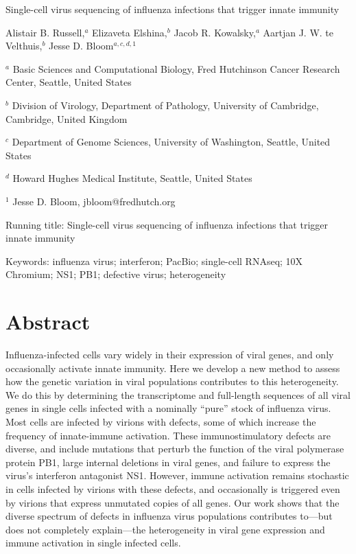 \documentclass[]{article}
\begin{document}
Single-cell virus sequencing of influenza infections that trigger innate immunity

Alistair B. Russell,$^{a}$
Elizaveta Elshina,$^{b}$
Jacob R. Kowalsky,$^{a}$
Aartjan J. W. te Velthuis,$^{b}$
Jesse D. Bloom$^{a,c,d,1}$

$^{a}$ Basic Sciences and Computational Biology, Fred Hutchinson Cancer Research Center, Seattle, United States
  
$^{b}$ Division of Virology, Department of Pathology, University of Cambridge, Cambridge, United Kingdom
  
$^{c}$ Department of Genome Sciences, University of Washington, Seattle, United States
  
$^{d}$ Howard Hughes Medical Institute, Seattle, United States

$^1$ Jesse D. Bloom, jbloom@fredhutch.org


Running title: Single-cell virus sequencing of influenza infections that trigger innate immunity


Keywords: influenza virus; interferon; PacBio; single-cell RNAseq; 10X Chromium; NS1; PB1; defective virus; heterogeneity

\clearpage

\section*{Abstract}
Influenza-infected cells vary widely in their expression of viral genes, and only occasionally activate innate immunity.
Here we develop a new method to assess how the genetic variation in viral populations contributes to this heterogeneity.
We do this by determining the transcriptome and full-length sequences of all viral genes in single cells infected with a nominally ``pure'' stock of influenza virus.
Most cells are infected by virions with defects, some of which increase the frequency of innate-immune activation.
These immunostimulatory defects are diverse, and include mutations that perturb the function of the viral polymerase protein PB1, large internal deletions in viral genes, and failure to express the virus's interferon antagonist NS1.
However, immune activation remains stochastic in cells infected by virions with these defects, and occasionally is triggered even by virions that express unmutated copies of all genes.
Our work shows that the diverse spectrum of defects in influenza virus populations contributes to---but does not completely explain---the heterogeneity in viral gene expression and immune activation in single infected cells.
\end{document}
